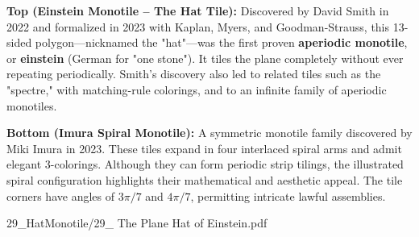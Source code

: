 \begin{SideNotePage}{
  \textbf{Top (Einstein Monotile – The Hat Tile):}  
  Discovered by David Smith in 2022 and formalized in 2023 with Kaplan, Myers, and Goodman-Strauss, this 13-sided polygon—nicknamed the "hat"—was the first proven \textbf{aperiodic monotile}, or \textbf{einstein} (German for "one stone"). It tiles the plane completely without ever repeating periodically. Smith’s discovery also led to related tiles such as the "spectre," with matching-rule colorings, and to an infinite family of aperiodic monotiles. \par

  \textbf{Bottom (Imura Spiral Monotile):}  
  A symmetric monotile family discovered by Miki Imura in 2023. These tiles expand in four interlaced spiral arms and admit elegant 3-colorings. Although they can form periodic strip tilings, the illustrated spiral configuration highlights their mathematical and aesthetic appeal. The tile corners have angles of $3\pi/7$ and $4\pi/7$, permitting intricate lawful assemblies. \par

}{29_HatMonotile/29_ The Plane Hat of Einstein.pdf}
\end{SideNotePage}
